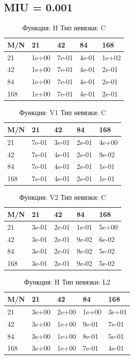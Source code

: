 \documentclass[a4paper,11pt]{article}
\begin{document}
\subsection{MIU = 0.001}
\begin{table}[H]
\caption {Функция: H Тип невязки: C   }
\begin{center}
\begin{tabular}{l|l|l|l|l}
\hline
M/N  & 21 & 42 & 84 & 168 \\ \hline
  21 & 1e+00& 7e-01& 4e-01& 1e+02\\ \hline
  42 & 1e+00& 7e-01& 4e-01& 2e-01\\ \hline
  84 & 1e+00& 7e-01& 4e-01& 2e-01\\ \hline
 168 & 1e+00& 7e-01& 4e-01& 2e-01\\ \hline
\end{tabular}
\end{center}
\end{table}
\begin{table}[H]
\caption {Функция: V1 Тип невязки: C   }
\begin{center}
\begin{tabular}{l|l|l|l|l}
\hline
M/N  & 21 & 42 & 84 & 168 \\ \hline
  21 & 7e-01& 3e-01& 2e-01& 4e+00\\ \hline
  42 & 7e-01& 4e-01& 2e-01& 9e-02\\ \hline
  84 & 7e-01& 4e-01& 2e-01& 1e-01\\ \hline
 168 & 7e-01& 4e-01& 2e-01& 1e-01\\ \hline
\end{tabular}
\end{center}
\end{table}
\begin{table}[H]
\caption {Функция: V2 Тип невязки: C   }
\begin{center}
\begin{tabular}{l|l|l|l|l}
\hline
M/N  & 21 & 42 & 84 & 168 \\ \hline
  21 & 3e-01& 2e-01& 1e-01& 5e+00\\ \hline
  42 & 3e-01& 2e-01& 9e-02& 6e-02\\ \hline
  84 & 3e-01& 2e-01& 9e-02& 5e-02\\ \hline
 168 & 3e-01& 2e-01& 9e-02& 5e-02\\ \hline
\end{tabular}
\end{center}
\end{table}
\begin{table}[H]
\caption {Функция: H Тип невязки: L2  }
\begin{center}
\begin{tabular}{l|l|l|l|l}
\hline
M/N  & 21 & 42 & 84 & 168 \\ \hline
  21 & 3e+00& 2e+00& 1e+00& 3e+01\\ \hline
  42 & 3e+00& 1e+00& 9e-01& 7e-01\\ \hline
  84 & 3e+00& 1e+00& 8e-01& 5e-01\\ \hline
 168 & 3e+00& 1e+00& 7e-01& 4e-01\\ \hline
\end{tabular}
\end{center}
\end{table}
\end{document}
